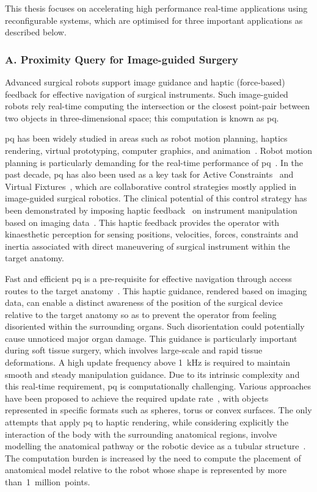 This thesis focuses on accelerating high performance real-time applications using reconfigurable systems, which are optimised for three important applications as described below.

\subsubsection{A. Proximity Query for Image-guided Surgery}

Advanced surgical robots support image guidance and haptic (force-based) feedback for effective navigation of surgical instruments. 
Such image-guided robots rely real-time computing the intersection or the closest point-pair
between two objects in three-dimensional space; 
this computation is known as \gls{pq}.

\gls{pq} has been widely studied in areas such as robot motion planning, haptics rendering, virtual prototyping, computer graphics, and animation~\cite{gilbert90}.
Robot motion planning is particularly demanding for the real-time performance of \gls{pq}~\cite{chakraborty08}. 
In the past decade, \gls{pq} has also been used as a key task for Active Constraints~\cite{kwok10} and Virtual Fixtures~\cite{li07}, which are collaborative control strategies mostly applied in image-guided surgical robotics. 
The clinical potential of this control strategy has been demonstrated by imposing haptic feedback~\cite{constantinescu05} on instrument manipulation based on imaging data~\cite{jakopec03}.
This haptic feedback provides the operator with kinaesthetic perception for sensing positions, velocities, forces, constraints and inertia associated with direct maneuvering of surgical
instrument within the target anatomy.

Fast and efficient \gls{pq} is a pre-requisite for effective navigation through access routes to the target anatomy~\cite{kwok10}.
This haptic guidance, rendered based on imaging data, can enable a distinct awareness of the position of the surgical device relative to the target anatomy so as to prevent the operator from feeling disoriented within the surrounding organs. 
Such disorientation could potentially cause unnoticed major organ damage. 
This guidance is particularly important during soft tissue surgery, which involves large-scale and rapid tissue deformations. 
A high update frequency above 1~kHz is required to maintain smooth and steady manipulation guidance. 
Due to its intrinsic complexity and this real-time requirement, \gls{pq} is computationally challenging.
Various approaches have been proposed to achieve the required update rate~\cite{benallegue09,chakraborty08}, 
with objects represented in specific formats such as spheres, torus or convex surfaces.
The only attempts that apply \gls{pq} to haptic rendering, while considering explicitly the interaction of the body with the surrounding anatomical regions, involve modelling the anatomical pathway or the robotic device as a tubular structure~\cite{li07,kwok13}.
The computation burden is increased by the need to compute the placement of anatomical model relative to the robot whose shape is represented by more than~1~million~points.

